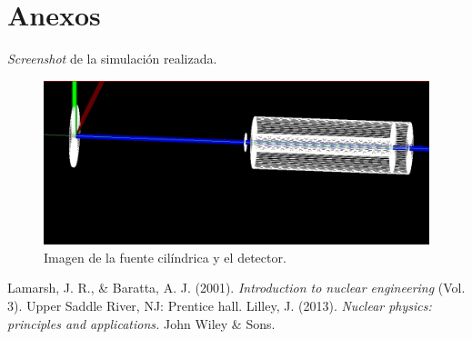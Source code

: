 \documentclass[conference]{IEEEtran}
\begin{document}
\section{Anexos}
\textit{Screenshot} de la simulación realizada.
\begin{figure}[H]
	\centering
	\includegraphics[scale=0.2]{./Imagenes/fig.jpeg}
	\caption{Imagen de la fuente cilíndrica y el detector.}
\end{figure}
        
        
        
\begin{thebibliography}{00}
 Lamarsh, J. R., \& Baratta, A. J. (2001). \textit{Introduction to nuclear engineering} (Vol. 3). Upper Saddle River, NJ: Prentice hall.
 Lilley, J. (2013). \textit{Nuclear physics: principles and applications.} John Wiley \& Sons.
\end{thebibliography}
\end{document}
